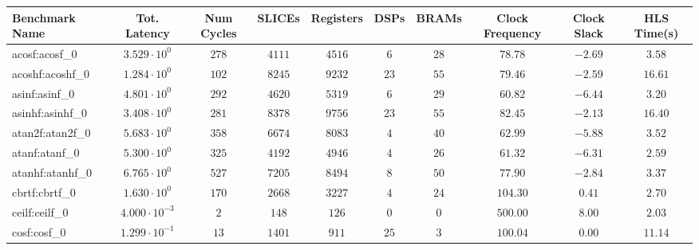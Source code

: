 \begin{tabular}{|l|c|c|c|c|c|c|c|c|c|}
\hline
Benchmark Name               & Tot. Latency            & Num Cycles & SLICEs     & Registers  & DSPs    & BRAMs   & Clock Frequency & Clock Slack & HLS Time(s) \\
\hline
acosf:acosf\_0               & $ 3.529 \cdot 10^{0}  $ & $ 278    $ & $ 4111   $ & $ 4516   $ & $ 6   $ & $ 28  $ & $ 78.78       $ & $ -2.69   $ & $ 3.58    $ \\
acoshf:acoshf\_0             & $ 1.284 \cdot 10^{0}  $ & $ 102    $ & $ 8245   $ & $ 9232   $ & $ 23  $ & $ 55  $ & $ 79.46       $ & $ -2.59   $ & $ 16.61   $ \\
asinf:asinf\_0               & $ 4.801 \cdot 10^{0}  $ & $ 292    $ & $ 4620   $ & $ 5319   $ & $ 6   $ & $ 29  $ & $ 60.82       $ & $ -6.44   $ & $ 3.20    $ \\
asinhf:asinhf\_0             & $ 3.408 \cdot 10^{0}  $ & $ 281    $ & $ 8378   $ & $ 9756   $ & $ 23  $ & $ 55  $ & $ 82.45       $ & $ -2.13   $ & $ 16.40   $ \\
atan2f:atan2f\_0             & $ 5.683 \cdot 10^{0}  $ & $ 358    $ & $ 6674   $ & $ 8083   $ & $ 4   $ & $ 40  $ & $ 62.99       $ & $ -5.88   $ & $ 3.52    $ \\
atanf:atanf\_0               & $ 5.300 \cdot 10^{0}  $ & $ 325    $ & $ 4192   $ & $ 4946   $ & $ 4   $ & $ 26  $ & $ 61.32       $ & $ -6.31   $ & $ 2.59    $ \\
atanhf:atanhf\_0             & $ 6.765 \cdot 10^{0}  $ & $ 527    $ & $ 7205   $ & $ 8494   $ & $ 8   $ & $ 50  $ & $ 77.90       $ & $ -2.84   $ & $ 3.37    $ \\
cbrtf:cbrtf\_0               & $ 1.630 \cdot 10^{0}  $ & $ 170    $ & $ 2668   $ & $ 3227   $ & $ 4   $ & $ 24  $ & $ 104.30      $ & $ 0.41    $ & $ 2.70    $ \\
ceilf:ceilf\_0               & $ 4.000 \cdot 10^{-3} $ & $ 2      $ & $ 148    $ & $ 126    $ & $ 0   $ & $ 0   $ & $ 500.00      $ & $ 8.00    $ & $ 2.03    $ \\
cosf:cosf\_0                 & $ 1.299 \cdot 10^{-1} $ & $ 13     $ & $ 1401   $ & $ 911    $ & $ 25  $ & $ 3   $ & $ 100.04      $ & $ 0.00    $ & $ 11.14   $ \\

\end{tabular}
